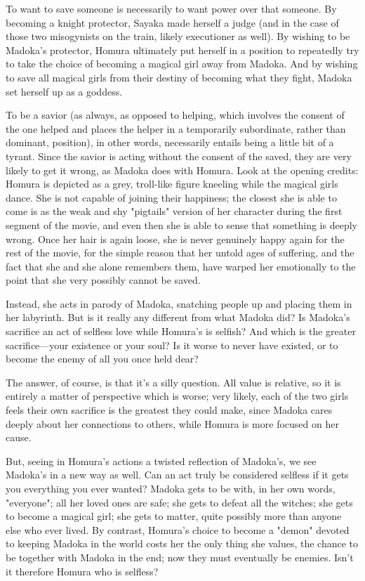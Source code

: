 To want to save someone is necessarily to want power over that someone. By becoming a knight protector, Sayaka made herself a judge (and in the case of those two misogynists on the train, likely executioner as well). By wishing to be Madoka's protector, Homura ultimately put herself in a position to repeatedly try to take the choice of becoming a magical girl away from Madoka. And by wishing to save all magical girls from their destiny of becoming what they fight, Madoka set herself up as a goddess. 

To be a savior (as always, as opposed to helping, which involves the consent of the one helped and places the helper in a temporarily subordinate, rather than dominant, position), in other words, necessarily entails being a little bit of a tyrant. Since the savior is acting without the consent of the saved, they are very likely to get it wrong, as Madoka does with Homura. Look at the opening credits: Homura is depicted as a grey, troll-like figure kneeling while the magical girls dance. She is not capable of joining their happiness; the closest she is able to come is as the weak and shy "pigtails" version of her character during the first segment of the movie, and even then she is able to sense that something is deeply wrong. Once her hair is again loose, she is never genuinely happy again for the rest of the movie, for the simple reason that her untold ages of suffering, and the fact that she and she alone remembers them, have warped her emotionally to the point that she very possibly cannot be saved. 

Instead, she acts in parody of Madoka, snatching people up and placing them in her labyrinth. But is it really any different from what Madoka did? Is Madoka's sacrifice an act of selfless love while Homura's is selfish? And which is the greater sacrifice—your existence or your soul? Is it worse to never have existed, or to become the enemy of all you once held dear?

The answer, of course, is that it's a silly question. All value is relative, so it is entirely a matter of perspective which is worse; very likely, each of the two girls feels their own sacrifice is the greatest they could make, since Madoka cares deeply about her connections to others, while Homura is more focused on her cause. 

But, seeing in Homura's actions a twisted reflection of Madoka's, we see Madoka's in a new way as well. Can an act truly be considered selfless if it gets you everything you ever wanted? Madoka gets to be with, in her own words, "everyone"; all her loved ones are safe; she gets to defeat all the witches; she gets to become a magical girl; she gets to matter, quite possibly more than anyone else who ever lived. By contrast, Homura's choice to become a "demon" devoted to keeping Madoka in the world costs her the only thing she values, the chance to be together with Madoka in the end; now they must eventually be enemies. Isn't it therefore Homura who is selfless?


